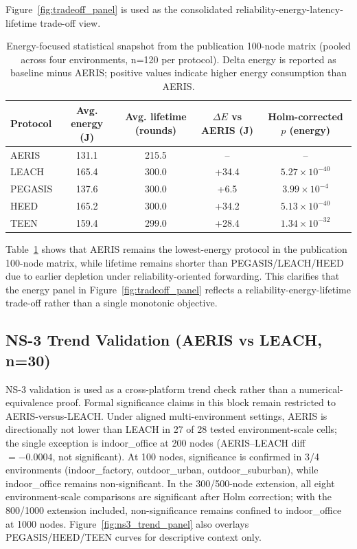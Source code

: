 ﻿\documentclass[sensors,article,submit,moreauthors,pdftex]{Definitions/mdpi}
\begin{document}
Figure~\ref{fig:tradeoff_panel} is used as the consolidated reliability-energy-latency-lifetime trade-off view.
\begin{table}[H]
\caption{Energy-focused statistical snapshot from the publication 100-node matrix (pooled across four environments, n=120 per protocol). Delta energy is reported as baseline minus AERIS; positive values indicate higher energy consumption than AERIS.}
\label{tab:energy_snapshot}
\centering
\begin{tabular}{lcccc}
\toprule
Protocol & Avg. energy (J) & Avg. lifetime (rounds) & $\Delta E$ vs AERIS (J) & Holm-corrected $p$ (energy) \\
\midrule
AERIS   & 131.1 & 215.5 & --    & -- \\
LEACH   & 165.4 & 300.0 & +34.4 & $5.27\times10^{-40}$ \\
PEGASIS & 137.6 & 300.0 & +6.5  & $3.99\times10^{-4}$ \\
HEED    & 165.2 & 300.0 & +34.2 & $5.13\times10^{-40}$ \\
TEEN    & 159.4 & 299.0 & +28.4 & $1.34\times10^{-32}$ \\
\bottomrule
\end{tabular}
\end{table}
Table~\ref{tab:energy_snapshot} shows that AERIS remains the lowest-energy protocol in the publication 100-node matrix, while lifetime remains shorter than PEGASIS/LEACH/HEED due to earlier depletion under reliability-oriented forwarding. This clarifies that the energy panel in Figure~\ref{fig:tradeoff_panel} reflects a reliability-energy-lifetime trade-off rather than a single monotonic objective.

\subsection{NS-3 Trend Validation (AERIS vs LEACH, n=30)}
NS-3 validation is used as a cross-platform trend check rather than a numerical-equivalence proof. Formal significance claims in this block remain restricted to AERIS-versus-LEACH. Under aligned multi-environment settings, AERIS is directionally not lower than LEACH in 27 of 28 tested environment-scale cells; the single exception is indoor\_office at 200 nodes (AERIS--LEACH diff $=-0.0004$, not significant). At 100 nodes, significance is confirmed in 3/4 environments (indoor\_factory, outdoor\_urban, outdoor\_suburban), while indoor\_office remains non-significant. In the 300/500-node extension, all eight environment-scale comparisons are significant after Holm correction; with the 800/1000 extension included, non-significance remains confined to indoor\_office at 1000 nodes. Figure~\ref{fig:ns3_trend_panel} also overlays PEGASIS/HEED/TEEN curves for descriptive context only.
\end{document}
